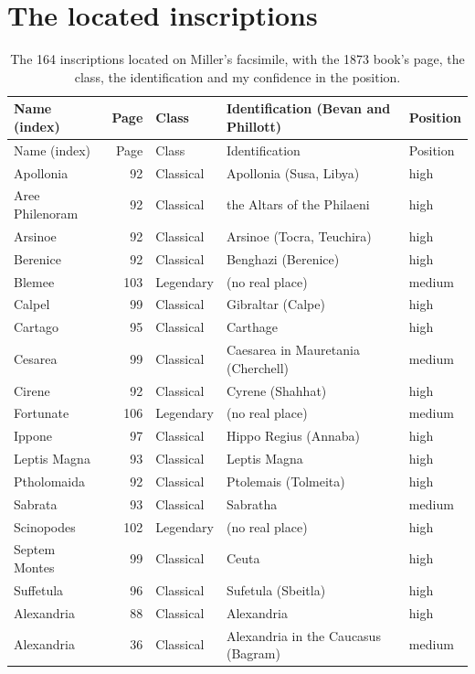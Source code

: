 \documentclass[11pt,a4paper]{article}
\begin{document}
\clearpage
\appendix
\section{The located inscriptions}
{\footnotesize\setlength{\tabcolsep}{4pt}\begin{longtable}{p{3.2cm}rlp{6.6cm}l}\caption{The 164 inscriptions located on Miller's facsimile, with the 1873 book's page, the class, the identification and my confidence in the position.}\label{tab:located}\\\toprule Name (index) & Page & Class & Identification (Bevan and Phillott) & Position\\\midrule\endfirsthead\toprule Name (index) & Page & Class & Identification & Position\\\midrule\endhead
Apollonia & 92 & Classical & Apollonia (Susa, Libya) & high\\
Aree Philenoram & 92 & Classical & the Altars of the Philaeni & high\\
Arsinoe & 92 & Classical & Arsinoe (Tocra, Teuchira) & high\\
Berenice & 92 & Classical & Benghazi (Berenice) & high\\
Blemee & 103 & Legendary & (no real place) & medium\\
Calpel & 99 & Classical & Gibraltar (Calpe) & high\\
Cartago & 95 & Classical & Carthage & high\\
Cesarea & 99 & Classical & Caesarea in Mauretania (Cherchell) & medium\\
Cirene & 92 & Classical & Cyrene (Shahhat) & high\\
Fortunate & 106 & Legendary & (no real place) & medium\\
Ippone & 97 & Classical & Hippo Regius (Annaba) & high\\
Leptis Magna & 93 & Classical & Leptis Magna & high\\
Ptholomaida & 92 & Classical & Ptolemais (Tolmeita) & high\\
Sabrata & 93 & Classical & Sabratha & medium\\
Scinopodes & 102 & Legendary & (no real place) & high\\
Septem Montes & 99 & Classical & Ceuta & high\\
Suffetula & 96 & Classical & Sufetula (Sbeitla) & high\\
Alexandria & 88 & Classical & Alexandria & high\\
Alexandria & 36 & Classical & Alexandria in the Caucasus (Bagram) & medium\\

\end{longtable}}
\end{document}
